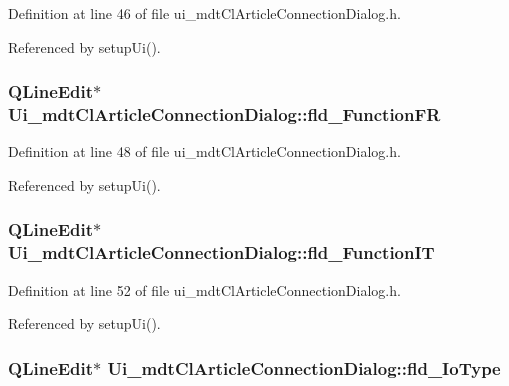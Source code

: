 Definition at line 46 of file ui\-\_\-mdt\-Cl\-Article\-Connection\-Dialog.\-h.



Referenced by setup\-Ui().

\hypertarget{class_ui__mdt_cl_article_connection_dialog_a12c1d1a957e06aa460c25a1abba1b882}{
\subsubsection[{fld\-\_\-\-Function\-F\-R}]{\setlength{\rightskip}{0pt plus 5cm}Q\-Line\-Edit$\ast$ Ui\-\_\-mdt\-Cl\-Article\-Connection\-Dialog\-::fld\-\_\-\-Function\-F\-R}}\label{class_ui__mdt_cl_article_connection_dialog_a12c1d1a957e06aa460c25a1abba1b882}


Definition at line 48 of file ui\-\_\-mdt\-Cl\-Article\-Connection\-Dialog.\-h.



Referenced by setup\-Ui().

\hypertarget{class_ui__mdt_cl_article_connection_dialog_aaef09bb06e456b8a282362ff111a657c}{
\subsubsection[{fld\-\_\-\-Function\-I\-T}]{\setlength{\rightskip}{0pt plus 5cm}Q\-Line\-Edit$\ast$ Ui\-\_\-mdt\-Cl\-Article\-Connection\-Dialog\-::fld\-\_\-\-Function\-I\-T}}\label{class_ui__mdt_cl_article_connection_dialog_aaef09bb06e456b8a282362ff111a657c}


Definition at line 52 of file ui\-\_\-mdt\-Cl\-Article\-Connection\-Dialog.\-h.



Referenced by setup\-Ui().

\hypertarget{class_ui__mdt_cl_article_connection_dialog_a79841a2082844f23a41e0dcb6bf42e4e}{
\subsubsection[{fld\-\_\-\-Io\-Type}]{\setlength{\rightskip}{0pt plus 5cm}Q\-Line\-Edit$\ast$ Ui\-\_\-mdt\-Cl\-Article\-Connection\-Dialog\-::fld\-\_\-\-Io\-Type}}\label{class_ui__mdt_cl_article_connection_dialog_a79841a2082844f23a41e0dcb6bf42e4e}


